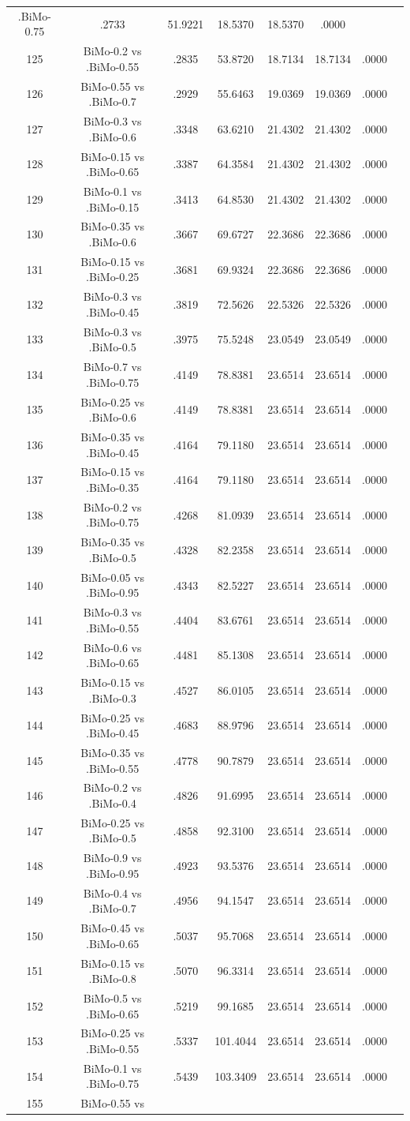 \documentclass[a4paper,10pt]{article}
\begin{document}
\begin{landscape}
\begin{table}[!htp]
\begin{tabular}{cccccccc}
.BiMo-0.75&.2733&51.9221&18.5370&18.5370&.0000\\125&BiMo-0.2 vs .BiMo-0.55&.2835&53.8720&18.7134&18.7134&.0000\\126&BiMo-0.55 vs .BiMo-0.7&.2929&55.6463&19.0369&19.0369&.0000\\127&BiMo-0.3 vs .BiMo-0.6&.3348&63.6210&21.4302&21.4302&.0000\\128&BiMo-0.15 vs .BiMo-0.65&.3387&64.3584&21.4302&21.4302&.0000\\129&BiMo-0.1 vs .BiMo-0.15&.3413&64.8530&21.4302&21.4302&.0000\\130&BiMo-0.35 vs .BiMo-0.6&.3667&69.6727&22.3686&22.3686&.0000\\131&BiMo-0.15 vs .BiMo-0.25&.3681&69.9324&22.3686&22.3686&.0000\\132&BiMo-0.3 vs .BiMo-0.45&.3819&72.5626&22.5326&22.5326&.0000\\133&BiMo-0.3 vs .BiMo-0.5&.3975&75.5248&23.0549&23.0549&.0000\\134&BiMo-0.7 vs .BiMo-0.75&.4149&78.8381&23.6514&23.6514&.0000\\135&BiMo-0.25 vs .BiMo-0.6&.4149&78.8381&23.6514&23.6514&.0000\\136&BiMo-0.35 vs .BiMo-0.45&.4164&79.1180&23.6514&23.6514&.0000\\137&BiMo-0.15 vs .BiMo-0.35&.4164&79.1180&23.6514&23.6514&.0000\\138&BiMo-0.2 vs .BiMo-0.75&.4268&81.0939&23.6514&23.6514&.0000\\139&BiMo-0.35 vs .BiMo-0.5&.4328&82.2358&23.6514&23.6514&.0000\\140&BiMo-0.05 vs .BiMo-0.95&.4343&82.5227&23.6514&23.6514&.0000\\141&BiMo-0.3 vs .BiMo-0.55&.4404&83.6761&23.6514&23.6514&.0000\\142&BiMo-0.6 vs .BiMo-0.65&.4481&85.1308&23.6514&23.6514&.0000\\143&BiMo-0.15 vs .BiMo-0.3&.4527&86.0105&23.6514&23.6514&.0000\\144&BiMo-0.25 vs .BiMo-0.45&.4683&88.9796&23.6514&23.6514&.0000\\145&BiMo-0.35 vs .BiMo-0.55&.4778&90.7879&23.6514&23.6514&.0000\\146&BiMo-0.2 vs .BiMo-0.4&.4826&91.6995&23.6514&23.6514&.0000\\147&BiMo-0.25 vs .BiMo-0.5&.4858&92.3100&23.6514&23.6514&.0000\\148&BiMo-0.9 vs .BiMo-0.95&.4923&93.5376&23.6514&23.6514&.0000\\149&BiMo-0.4 vs .BiMo-0.7&.4956&94.1547&23.6514&23.6514&.0000\\150&BiMo-0.45 vs .BiMo-0.65&.5037&95.7068&23.6514&23.6514&.0000\\151&BiMo-0.15 vs .BiMo-0.8&.5070&96.3314&23.6514&23.6514&.0000\\152&BiMo-0.5 vs .BiMo-0.65&.5219&99.1685&23.6514&23.6514&.0000\\153&BiMo-0.25 vs .BiMo-0.55&.5337&101.4044&23.6514&23.6514&.0000\\154&BiMo-0.1 vs .BiMo-0.75&.5439&103.3409&23.6514&23.6514&.0000\\155&BiMo-0.55 vs 
\end{tabular}
\end{table}
\end{landscape}
\end{document}
